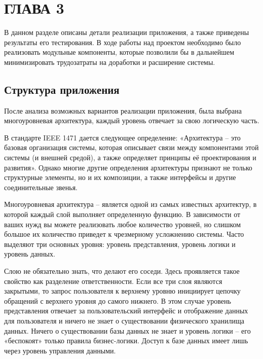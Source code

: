 \section{ГЛАВА 3}


В данном разделе описаны детали реализации приложения, а также приведены результаты его тестирования.
В ходе работы над проектом необходимо было реализовать модульные компоненты, которые позволили
бы в дальнейшем минимизировать трудозатраты на доработки и расширение системы.

\subsection{Структура приложения}

После анализа возможных вариантов реализации приложения, была выбрана многоуровневая архитектура,
каждый уровень отвечает за свою логическую часть.

В стандарте IEEE 1471 дается следующее определение: «Архитектура – это базовая организация
системы, которая описывает связи между компонентами этой системы (и внешней средой),
а также определяет принципы её проектирования и развития». Однако многие другие определения
архитектуры признают не только структурные элементы, но и их композиции, а также интерфейсы
и другие соединительные звенья.

Многоуровневая архитектура – является одной из самых известных архитектур, в которой
каждый слой выполняет определенную функцию. В зависимости от ваших нужд вы можете
реализовать любое количество уровней, но слишком большое их количество приведет к
чрезмерному усложнению системы. Часто выделяют три основных уровня: уровень представления,
уровень логики и уровень данных.

Слою не обязательно знать, что делают его соседи. Здесь проявляется такое свойство как
разделение ответственности. Если все три слоя являются закрытыми, то запрос пользователя
к верхнему уровню инициирует цепочку обращений с верхнего уровня до самого нижнего.
В этом случае уровень представления отвечает за пользовательский интерфейс и отображение
данных для пользователя и ничего не знает о существовании физического хранилища данных.
Ничего о существовании базы данных не знает и уровень логики – его «беспокоят» только
правила бизнес-логики. Доступ к базе данных имеет лишь через уровень управления данными.

